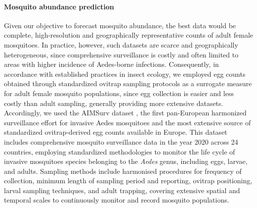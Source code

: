 \documentclass[preprint,12pt]{elsarticle}
\begin{document}
\paragraph{Mosquito abundance prediction}
Given our objective to forecast mosquito abundance, the best data would be complete, high-resolution and geographically representative counts of adult female mosquitoes. In practice, however, such datasets are scarce and geographically heterogeneous, since comprehensive surveillance is costly and often limited to areas with higher incidence of Aedes-borne infections. Consequently, in accordance with established practices in insect ecology, we employed egg counts obtained through standardized ovitrap sampling protocols as a surrogate measure for adult female mosquito populations, since egg collection is easier and less costly than adult sampling, generally providing more extensive datasets\cite{Manica2017, Steindorf2025}. Accordingly, we used the AIMSurv dataset \cite{miranda2022aimsurv}, the first pan-European harmonized surveillance effort for invasive Aedes mosquitoes and the most extensive source of standardized ovitrap-derived egg counts available in Europe.
This dataset includes comprehensive mosquito surveillance data in the year 2020 across 24 countries, employing standardized methodologies to monitor the life cycle of invasive mosquitoes species belonging to the \emph{Aedes} genus, including eggs, larvae, and adults. Sampling methods include harmonised procedures for frequency of collection, minimum length of sampling period and reporting, ovitrap positioning, larval sampling techniques, and adult trapping, covering extensive spatial and temporal scales to continuously monitor and record mosquito populations.
\end{document}
